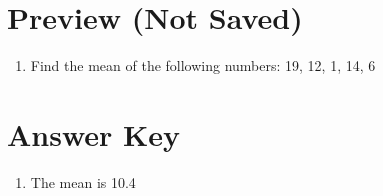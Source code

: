 \documentclass[12pt]{article}
\begin{document}
\section*{Preview (Not Saved)}

\begin{enumerate}[label=\textbf{\arabic*.}]
  \item Find the mean of the following numbers:
19, 12, 1, 14, 6
\end{enumerate}

\newpage
\section*{Answer Key}

\begin{enumerate}[label=\textbf{\arabic*.}]
  \item The mean is 10.4
\end{enumerate}
\end{document}
